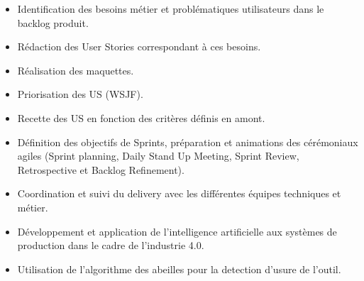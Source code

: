 \documentclass[10pt,a4paper,ragged2e]{altacv}
\begin{document}

\begin{fullwidth}
\makecvheader
\end{fullwidth}




\begin{itemize}
    \item Identification des besoins métier et problématiques utilisateurs dans le backlog produit.
    \item Rédaction des User Stories correspondant à ces besoins.
    \item Réalisation des maquettes.
    \item Priorisation des US (WSJF).
    \item Recette des US en fonction des critères définis en amont.
    \item Définition des objectifs de Sprints, préparation et animations des cérémoniaux agiles (Sprint
 planning, Daily Stand Up Meeting, Sprint Review, Retrospective et Backlog Refinement).
 \item  Coordination et suivi du delivery avec les différentes équipes techniques et métier.
\end{itemize}
\vspace{10px}
\begin{itemize}
    \item Développement et application de l'intelligence artificielle aux systèmes de production dans le cadre de l'industrie 4.0.
    \item Utilisation de l’algorithme des abeilles pour la detection d’usure de l’outil.
\end{itemize}
\vspace{10px}
\end{document}

